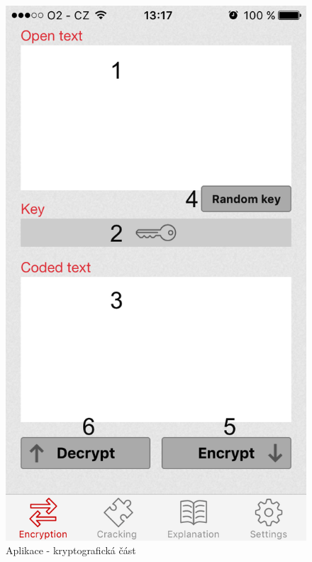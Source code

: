 \documentclass[glossaries, index]{kidiplom}
\begin{document}
\begin{figure}[htbp]
\centering
\includegraphics[scale=0.32]{graphics/app/encryption.png}
\caption{Aplikace - kryptografická část}
\label{app-encryption}
\end{figure}

\newpage
\end{document}
